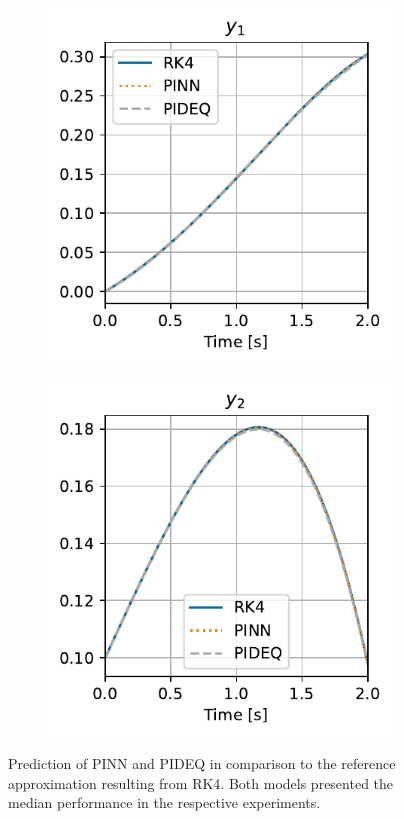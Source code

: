 \begin{figure}[h]
    \centering
    \begin{subfigure}[t]{.45\textwidth}
	\includegraphics{images/final_vdp_y1.pdf}
	\caption{}
    \end{subfigure}
    \begin{subfigure}[t]{.45\textwidth}
	\includegraphics{images/final_vdp_y2.pdf}
	\caption{}
    \end{subfigure}
    \caption{Prediction of \gls{PINN} and \gls{PIDEQ} in comparison to the reference approximation resulting from \gls{RK4}. Both models presented the median performance in the respective experiments.}
    \label{fig:final-vdp}
\end{figure}

